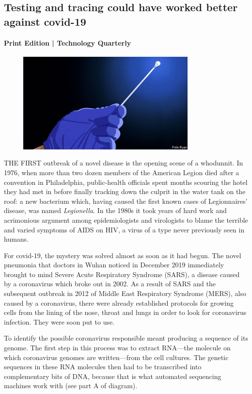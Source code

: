 \documentclass{article}
\begin{document}
\subsection{Testing and tracing could have worked better against covid-19 }
\paragraph{Print Edition | Technology Quarterly  \quad \color{gray}{Mar 23rd 2021 }}
\begin{figure}[h]
\centering
\includegraphics[width=0.8\textwidth]{images/20210327_tqd002.jpg}
\end{figure}
\lettrine{T} HE FIRST outbreak of a novel disease is the opening scene of a whodunnit. In 1976, when more than two dozen members of the American Legion died after a convention in Philadelphia, public-health officials spent months scouring the hotel they had met in before finally tracking down the culprit in the water tank on the roof: a new bacterium which, having caused the first known cases of Legionnaires' disease, was named \emph{Legionella}. In the 1980s it took years of hard work and acrimonious argument among epidemiologists and virologists to blame the terrible and varied symptoms of AIDS on HIV, a virus of a type never previously seen in humans. 

For covid-19, the mystery was solved almost as soon as it had begun. The novel pneumonia that doctors in Wuhan noticed in December 2019 immediately brought to mind Severe Acute Respiratory Syndrome (SARS), a disease caused by a coronavirus which broke out in 2002. As a result of SARS and the subsequent outbreak in 2012 of Middle East Respiratory Syndrome (MERS), also caused by a coronavirus, there were already established protocols for growing cells from the lining of the nose, throat and lungs in order to look for coronavirus infection. They were soon put to use. 

To identify the possible coronavirus responsible meant producing a sequence of its genome. The first step in this process was to extract RNA---the molecule on which coronavirus genomes are written---from the cell cultures. The genetic sequences in these RNA molecules then had to be transcribed into complementary bits of DNA, because that is what automated sequencing machines work with (see part A of diagram). 
\end{document}
